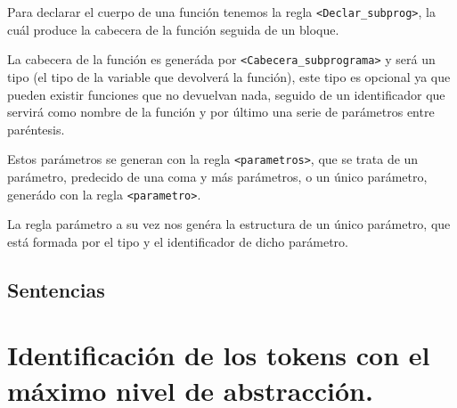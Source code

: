 \documentclass[12pt, spanish]{article}
\begin{document}
Para declarar el cuerpo de una función tenemos la regla \texttt{<Declar\_subprog>}, la cuál produce la cabecera de la función seguida de un bloque.

La cabecera de la función es generáda por \texttt{<Cabecera\_subprograma>} y será un tipo (el tipo de la variable que devolverá la función), este tipo es opcional ya que pueden existir funciones que no devuelvan nada, seguido de un identificador que servirá como nombre de la función y por último una serie de parámetros entre paréntesis.

Estos parámetros se generan con la regla \texttt{<parametros>}, que se trata de un parámetro, predecido de una coma y más parámetros, o un único parámetro, generádo con la regla \texttt{<parametro>}.

La regla parámetro a su vez nos genéra la estructura de un único parámetro, que está formada por el tipo y el identificador de dicho parámetro.

\subsection{Sentencias}




\section{Identificación de los tokens con el máximo nivel de abstracción.}
\end{document}
